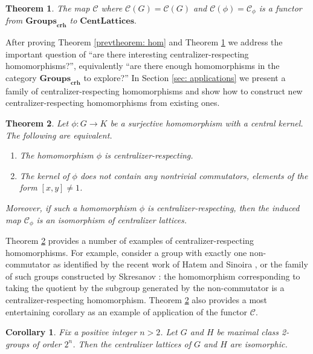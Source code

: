\documentclass[12pt]{amsart}
\newtheorem{prevtheorem}{Theorem}
\newtheorem{corollary}[theorem]{Corollary}
\begin{document}
\begin{prevtheorem}\label{prevtheorem: functor} The map $\mathcal{C}$ where $\mathcal{C}(G) = \mathcal{C}(G)$ and $\mathcal{C}(\phi) =\mathcal{C}_{\phi}$ is a functor from $\mathbf{Groups}_{\mathbf{crh}}$ to $\mathbf{CentLattices}.$    
\end{prevtheorem}

After proving Theorem \ref{prevtheorem: hom} and Theorem \ref{prevtheorem: functor} we address the important question of ``are there interesting centralizer-respecting homomorphisms?'', equivalently ``are there enough homomorphisms in the category $\mathbf{Groups}_{\mathbf{crh}}$ to explore?'' In Section \ref{sec: applications} we present a family of centralizer-respecting homomorphisms and show how to construct new centralizer-respecting homomorphisms from existing ones. 

\begin{prevtheorem}\label{prevtheorem: iff}
    Let $\phi:G\rightarrow K$ be a surjective homomorphism with a central kernel. The following are equivalent.
    \begin{enumerate}
        \item The homomorphism $\phi$ is centralizer-respecting.
        \item The kernel of $\phi$ does not contain any nontrivial commutators, elements of the form $[x,y] \neq 1$.
    \end{enumerate} 
    Moreover, if such a homomorphism $\phi$ is centralizer-respecting, then the induced map $\mathcal{C}_{\phi}$ is an isomorphism of centralizer lattices. 
\end{prevtheorem}

Theorem \ref{prevtheorem: iff} provides a number of examples of centralizer-respecting homomorphisms. For example, consider a group with exactly one non-commutator as identified by the recent work of Hatem and Sinoira \cite{hatem2026group}, or the family of such groups constructed by Skresanov \cite{skresanov2025finite}: the homomorphism corresponding to taking the quotient by the subgroup generated by the non-commutator is a centralizer-respecting homomorphism. Theorem \ref{prevtheorem: iff} also provides a most entertaining corollary as an example of application of the functor $\mathcal{C}$. 

\begin{corollary}\label{cor: iff}
    Fix a positive integer $n>2$. Let $G$ and $H$ be maximal class 2-groups of order $2^n$. Then the centralizer lattices of $G$ and $H$ are isomorphic.  
\end{corollary}
\end{document}
